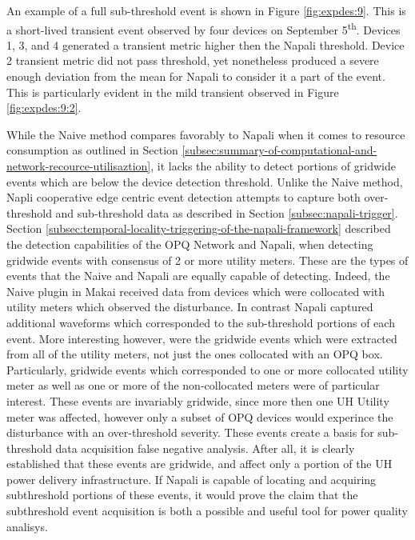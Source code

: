 An example of a full sub-threshold event is shown in Figure \ref{fig:expdes:9}.
This is a short-lived transient event observed by four devices on September 5\textsuperscript{th}.
Devices 1, 3, and 4 generated a transient metric higher then the Napali threshold.
Device 2 transient metric did not pass threshold, yet nonetheless produced a severe enough deviation from the mean for Napali to consider it a part of the event.
This is particularly evident in the mild transient observed in Figure \ref{fig:expdes:9:2}.

While the Naive method compares favorably to Napali when it comes to resource consumption as outlined in Section \ref{subsec:summary-of-computational-and-network-recource-utilisaztion}, it lacks the ability to detect portions of gridwide events which are below the device detection threshold.
Unlike the Naive method, Napli cooperative edge centric event detection attempts to capture both over-threshold and sub-threshold data as described in Section \ref{subsec:napali-trigger}.
Section \ref{subsec:temporal-locality-triggering-of-the-napali-framework} described the detection capabilities of the OPQ Network and Napali, when detecting gridwide events with consensus of 2 or more utility meters.
These are the types of events that the Naive and Napali are equally capable of detecting.
Indeed, the Naive plugin in Makai received data from devices which were collocated with utility meters which observed the disturbance.
In contrast Napali  captured additional waveforms which corresponded to the sub-threshold portions of each event.
More interesting however, were the gridwide events which were extracted from all of the utility meters, not just the ones collocated with an OPQ box.
Particularly, gridwide events which corresponded to one or more collocated utility meter as well as one or more of the non-collocated meters were of particular interest.
These events are invariably gridwide, since more then one UH Utility meter was affected, however only a subset of OPQ devices would experince the disturbance with an over-threshold severity.
These events create a basis for sub-threshold data acquisition false negative analysis.
After all, it is clearly established that these events are gridwide, and affect only a portion of the UH power delivery infrastructure.
If Napali is capable of locating and acquiring subthreshold portions of these events, it would prove the claim that the subthreshold event acquisition is both a possible and useful tool for power quality analisys.

